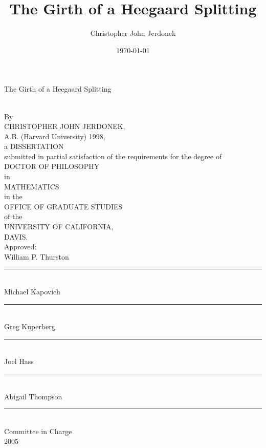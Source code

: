 \documentclass[12pt, oneside]{amsart}
\newcommand{\skipline}{\vspace{12pt}}
\begin{document}
\pagestyle{plain}


\title{The Girth of a Heegaard Splitting}
\author{Christopher John Jerdonek}
\date{\today}


\begin{center}

\begin{Large}The Girth of a Heegaard Splitting\end{Large}\\
\skipline
By\\
\skipline
CHRISTOPHER JOHN JERDONEK,\\
A.B. (Harvard University) 1998,\\
\skipline
a DISSERTATION\\
\skipline
submitted in partial satisfaction of the requirements for the degree of\\
\skipline
DOCTOR OF PHILOSOPHY\\
\skipline
in\\
\skipline
MATHEMATICS\\
\skipline
in the\\
\skipline
OFFICE OF GRADUATE STUDIES\\
\skipline
of the\\
\skipline
UNIVERSITY OF CALIFORNIA,\\
\skipline
DAVIS.\\
\vspace{.5in}
Approved:\\
\vspace{.25in}
William P. Thurston\\
\vspace{-.1in}\rule{2.5in}{1pt}\\
\medskip
Michael Kapovich\\
\vspace{-.1in}\rule{2.5in}{1pt}\\
\medskip
Greg Kuperberg\\
\vspace{-.1in}\rule{2.5in}{1pt}\\
\medskip
Joel Hass\\
\vspace{-.1in}\rule{2.5in}{1pt}\\
\medskip
Abigail Thompson\\
\vspace{-.1in}\rule{2.5in}{1pt}\\
\vspace{.2in}
Committee in Charge\\
\skipline
2005\\

\end{center}
\end{document}
